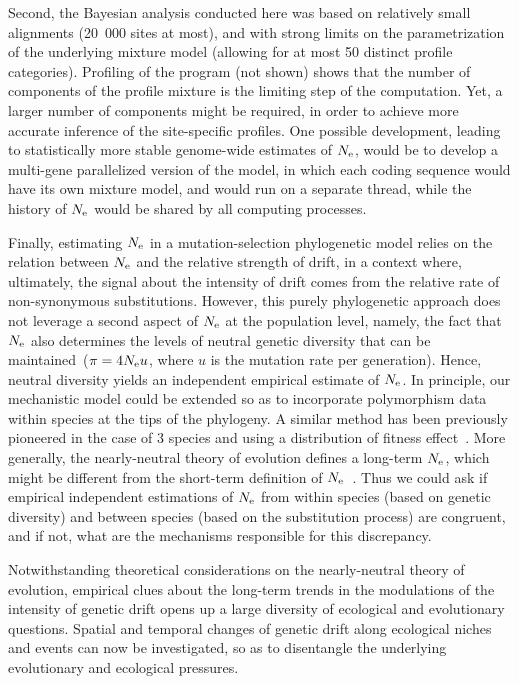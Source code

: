 \documentclass{article}
\begin{document}
    Second, the Bayesian analysis conducted here was based on relatively small alignments (20~000 sites at most), and with strong limits on the parametrization of the underlying mixture model (allowing for at most 50 distinct profile categories).
    Profiling of the program (not shown) shows that the number of components of the profile mixture is the limiting step of the computation.
    Yet, a larger number of components might be required, in order to achieve more accurate inference of the site-specific profiles.
    One possible development, leading to statistically more stable genome-wide estimates of $N_{\text{e}}$, would be to develop a multi-gene parallelized version of the model, in which each coding sequence would have its own mixture model, and would run on a separate thread, while the history of $N_{\text{e}}$ would be shared by all computing processes.

    Finally, estimating $N_{\text{e}}$ in a mutation-selection phylogenetic model relies on the relation between $N_{\text{e}}$ and the relative strength of drift, in a context where, ultimately, the signal about the intensity of drift comes from the relative rate of {non-synonymous} substitutions.
    However, this purely phylogenetic approach does not leverage a second aspect of $N_{\text{e}}$ at the population level, namely, the fact that $N_{\text{e}}$ also determines the levels of {neutral} genetic diversity that can be maintained~($\pi=4N_{\text{e}} u$, where $u$ is the mutation rate per generation).
    Hence, {neutral} diversity yields an independent empirical estimate of $N_{\text{e}}$.
    In principle, our mechanistic model could be extended so as to incorporate polymorphism data within species at the tips of the phylogeny.
    A similar method has been previously pioneered in the case of 3 species and using a distribution of fitness effect~\citep{Wilson2011}.
    More generally, the {nearly-neutral} theory of evolution defines a long-term $N_{\text{e}}$, which might be different from the short-term definition of $N_{\text{e}}$~\citep{Platt2018}.
    Thus we could ask if empirical independent estimations of $N_{\text{e}}$ from within species (based on genetic diversity) and between species (based on the {substitution} process) are congruent, and if not, what are the mechanisms responsible for this discrepancy.

    Notwithstanding theoretical considerations on the {nearly-neutral} theory of evolution, empirical clues about the long-term trends in the modulations of the intensity of {genetic drift} opens up a large diversity of ecological and evolutionary questions.
    Spatial and temporal changes of {genetic drift} along ecological niches and events can now be investigated, so as to disentangle the underlying evolutionary and ecological pressures.
\end{document}
